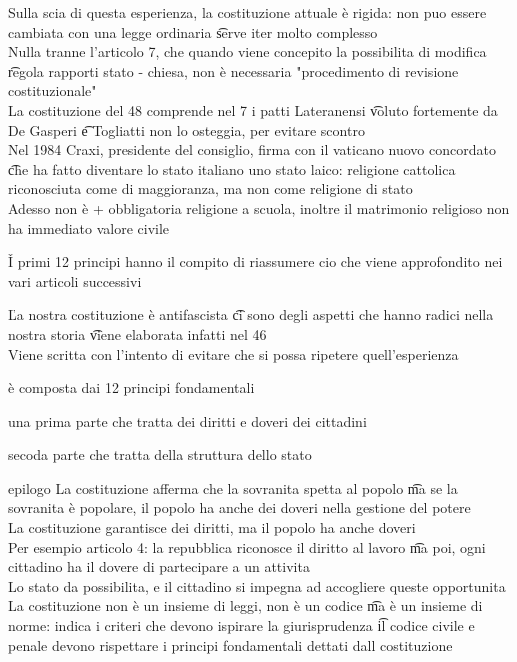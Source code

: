 \documentclass[12pt]{article}
\begin{document}
Sulla scia di questa esperienza, la costituzione attuale è rigida: non puo essere cambiata con una legge ordinaria \t serve iter molto complesso \\
Nulla tranne l'articolo 7, che quando viene concepito la possibilita di modifica \t regola rapporti stato - chiesa, non è necessaria "procedimento di revisione costituzionale" \\
La costituzione del 48 comprende nel 7 i patti Lateranensi \t voluto fortemente da De Gasperi \t e Togliatti non lo osteggia, per evitare scontro \\
Nel 1984 Craxi, presidente del consiglio, firma con il vaticano nuovo concordato \t che ha fatto diventare lo stato italiano uno stato laico: religione cattolica riconosciuta come di maggioranza, ma non come religione di stato \\
Adesso non è + obbligatoria religione a scuola, inoltre il matrimonio religioso non ha immediato valore civile

\v

I primi 12 principi hanno il compito di riassumere cio che viene approfondito nei vari articoli successivi

\v

La nostra costituzione è antifascista \t ci sono degli aspetti che hanno radici nella nostra storia \t viene elaborata infatti nel 46 \\
Viene scritta con l'intento di evitare che si possa ripetere quell'esperienza \\
\bi
  \item è composta dai 12 principi fondamentali
  \item una prima parte che tratta dei diritti e doveri dei cittadini
  \item secoda parte che tratta della struttura dello stato
  \item epilogo
\ei
La costituzione afferma che la sovranita spetta al popolo \t ma se la sovranita è popolare, il popolo ha anche dei doveri nella gestione del potere \\
La costituzione garantisce dei diritti, ma il popolo ha anche doveri \\
Per esempio articolo 4: la repubblica riconosce il diritto al lavoro \t ma poi, ogni cittadino ha il dovere di partecipare a un attivita \\
Lo stato da possibilita, e il cittadino si impegna ad accogliere queste opportunita \\
La costituzione non è un insieme di leggi, non è un codice \t ma è un insieme di norme: indica i criteri che devono ispirare la giurisprudenza \t il codice civile e penale devono rispettare i principi fondamentali dettati dall costituzione
\end{document}
